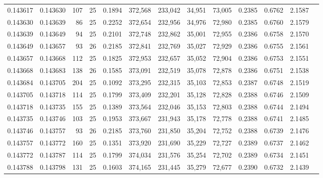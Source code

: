 \begin{tabular}{rrrrrrrrrrrrr}
0.143617 & 0.143630 &   107 &  25 &                                     0.1894 & 372,568 & 233,042 &  34,951 &  73,005 & 0.2385 & 0.6762 & 2.1587 \\
0.143630 & 0.143639 &    86 &  25 &                                     0.2252 & 372,654 & 232,956 &  34,976 &  72,980 & 0.2385 & 0.6760 & 2.1579 \\
0.143639 & 0.143649 &    94 &  25 &                                     0.2101 & 372,748 & 232,862 &  35,001 &  72,955 & 0.2386 & 0.6758 & 2.1570 \\
0.143649 & 0.143657 &    93 &  26 &                                     0.2185 & 372,841 & 232,769 &  35,027 &  72,929 & 0.2386 & 0.6755 & 2.1561 \\
0.143657 & 0.143668 &   112 &  25 &                                     0.1825 & 372,953 & 232,657 &  35,052 &  72,904 & 0.2386 & 0.6753 & 2.1551 \\
0.143668 & 0.143683 &   138 &  26 &                                     0.1585 & 373,091 & 232,519 &  35,078 &  72,878 & 0.2386 & 0.6751 & 2.1538 \\
0.143684 & 0.143705 &   204 &  25 &                                     0.1092 & 373,295 & 232,315 &  35,103 &  72,853 & 0.2387 & 0.6748 & 2.1519 \\
0.143705 & 0.143718 &   114 &  25 &                                     0.1799 & 373,409 & 232,201 &  35,128 &  72,828 & 0.2388 & 0.6746 & 2.1509 \\
0.143718 & 0.143735 &   155 &  25 &                                     0.1389 & 373,564 & 232,046 &  35,153 &  72,803 & 0.2388 & 0.6744 & 2.1494 \\
0.143735 & 0.143746 &   103 &  25 &                                     0.1953 & 373,667 & 231,943 &  35,178 &  72,778 & 0.2388 & 0.6741 & 2.1485 \\
0.143746 & 0.143757 &    93 &  26 &                                     0.2185 & 373,760 & 231,850 &  35,204 &  72,752 & 0.2388 & 0.6739 & 2.1476 \\
0.143757 & 0.143772 &   160 &  25 &                                     0.1351 & 373,920 & 231,690 &  35,229 &  72,727 & 0.2389 & 0.6737 & 2.1462 \\
0.143772 & 0.143787 &   114 &  25 &                                     0.1799 & 374,034 & 231,576 &  35,254 &  72,702 & 0.2389 & 0.6734 & 2.1451 \\
0.143788 & 0.143798 &   131 &  25 &                                     0.1603 & 374,165 & 231,445 &  35,279 &  72,677 & 0.2390 & 0.6732 & 2.1439 \\

\end{tabular}
